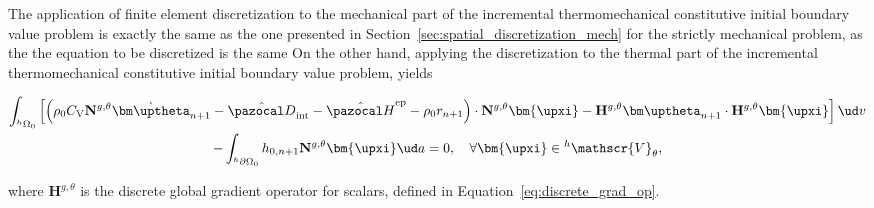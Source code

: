 The application of finite element discretization to the mechanical part of the incremental thermomechanical constitutive initial boundary value problem is exactly the same as the one presented in Section~\ref{sec:spatial_discretization_mech} for the strictly mechanical problem, as the the equation to be discretized is the same
On the other hand, applying the discretization to the thermal part of the incremental thermomechanical constitutive initial boundary value problem, yields
\begin{highlight}[innertopmargin=-5pt]
    \begin{multline}
    \int_{^h\Omega_0}   \left[\left(\rho_0C_\mathrm{V}\mathbf N^{g,\theta} \dot{\bm\uptheta}_{n+1} -\hat{\pazocal D}_\text{int} - \hat{\pazocal H}^\text{ep}- \rho_0 r_{n+1} \right) \cdot \mathbf N^{g,\theta}\bm{\upxi} - \mathbf H^{g,\theta} {\bm\uptheta}_{n+1} \cdot \mathbf H^{g,\theta} \bm{\upxi}\right]\ud v \\- \int_{^h\partial\Omega_0} h_{0,n+1} \mathbf N^{g,\theta}\bm{\upxi}\ud a = 0,\quad \forall \bm{\upxi} \in {}^h\mathscr{V}_{\theta}, \label{eq:thermo_mech_thermo_fem_disc}
    \end{multline}
\end{highlight}
where $\mathbf H^{g,\theta}$ is the discrete global gradient operator for scalars, defined in Equation~\eqref{eq:discrete_grad_op}.

